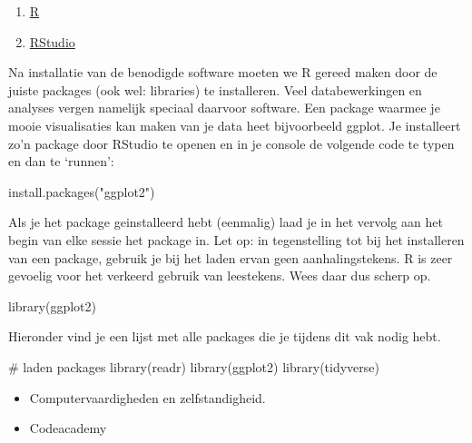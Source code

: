 \documentclass[
  letterpaper,
  DIV=11,
  numbers=noendperiod]{scrreprt}
\newenvironment{Shaded}{\begin{snugshade}}{\end{snugshade}}
\newcommand{\CommentTok}[1]{\textcolor[rgb]{0.37,0.37,0.37}{#1}}
\newcommand{\FunctionTok}[1]{\textcolor[rgb]{0.28,0.35,0.67}{#1}}
\newcommand{\NormalTok}[1]{\textcolor[rgb]{0.00,0.23,0.31}{#1}}
\newcommand{\StringTok}[1]{\textcolor[rgb]{0.13,0.47,0.30}{#1}}
\providecommand{\tightlist}{%
  \setlength{\itemsep}{0pt}\setlength{\parskip}{0pt}}
\begin{document}
\begin{enumerate}
\def\labelenumi{\arabic{enumi}.}
\tightlist
\item
  \href{https://cran.r-project.org/}{R}
\item
  \href{https://docs.posit.co/ide/user/\#rstudio-ide-oss-downloads}{RStudio}
\end{enumerate}

Na installatie van de benodigde software moeten we R gereed maken door
de juiste packages (ook wel: libraries) te installeren. Veel
databewerkingen en analyses vergen namelijk speciaal daarvoor software.
Een package waarmee je mooie visualisaties kan maken van je data heet
bijvoorbeeld ggplot. Je installeert zo'n package door RStudio te openen
en in je console de volgende code te typen en dan te `runnen':

\begin{Shaded}
\begin{Highlighting}[]
\FunctionTok{install.packages}\NormalTok{(}\StringTok{"ggplot2"}\NormalTok{)}
\end{Highlighting}
\end{Shaded}

Als je het package geinstalleerd hebt (eenmalig) laad je in het vervolg
aan het begin van elke sessie het package in. Let op: in tegenstelling
tot bij het installeren van een package, gebruik je bij het laden ervan
geen aanhalingstekens. R is zeer gevoelig voor het verkeerd gebruik van
leestekens. Wees daar dus scherp op.

\begin{Shaded}
\begin{Highlighting}[]
\FunctionTok{library}\NormalTok{(ggplot2)}
\end{Highlighting}
\end{Shaded}

Hieronder vind je een lijst met alle packages die je tijdens dit vak
nodig hebt.

\begin{Shaded}
\begin{Highlighting}[]
\CommentTok{\# laden packages}
\FunctionTok{library}\NormalTok{(readr)}
\FunctionTok{library}\NormalTok{(ggplot2)}
\FunctionTok{library}\NormalTok{(tidyverse)}
\end{Highlighting}
\end{Shaded}

\begin{itemize}
\item
  Computervaardigheden en zelfstandigheid.
\item
  Codeacademy
\end{itemize}
\end{document}
